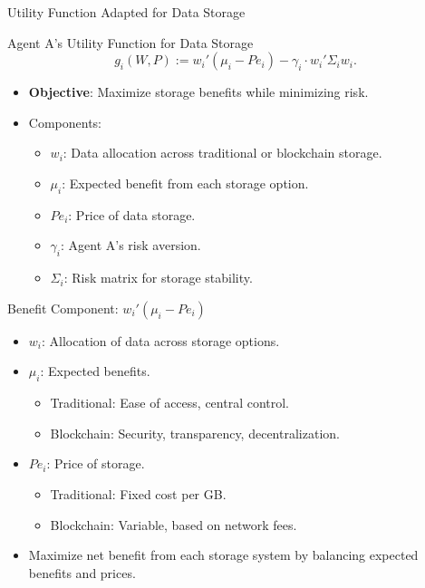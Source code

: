 \documentclass[aspectratio=169]{beamer}
\begin{document}
\begin{frame}{Utility Function Adapted for Data Storage}
    \begin{block}{Agent A's Utility Function for Data Storage}
    \[
    g_i(W, P) := w_i' (\mu_i - P e_i) - \gamma_i \cdot w_i' \Sigma_i w_i.
    \]
    \end{block}
    \begin{itemize}
        \item \textbf{Objective}: Maximize storage benefits while minimizing risk.
        \item Components:
        \begin{itemize}
            \item \( w_i \): Data allocation across traditional or blockchain storage.
            \item \( \mu_i \): Expected benefit from each storage option.
            \item \( P e_i \): Price of data storage.
            \item \( \gamma_i \): Agent A's risk aversion.
            \item \( \Sigma_i \): Risk matrix for storage stability.
        \end{itemize}
    \end{itemize}
\end{frame}



\begin{frame}{Benefit Component: \( w_i' (\mu_i - P e_i) \)}
    \begin{itemize}
        \item \( w_i \): Allocation of data across storage options.
        \item \( \mu_i \): Expected benefits.
        \begin{itemize}
            \item Traditional: Ease of access, central control.
            \item Blockchain: Security, transparency, decentralization.
        \end{itemize}
        \item \( P e_i \): Price of storage.
        \begin{itemize}
            \item Traditional: Fixed cost per GB.
            \item Blockchain: Variable, based on network fees.
        \end{itemize}
        \item Maximize net benefit from each storage system by balancing expected benefits and prices.
    \end{itemize}
\end{frame}
\end{document}
